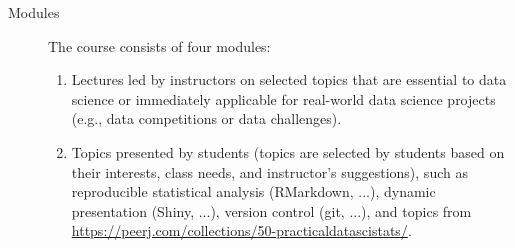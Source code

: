 \documentclass[twocolumn, 11pt]{article}
\begin{document}
\begin{description}
\item[Modules] 
The course consists of four modules:
\begin{enumerate}
\item
  Lectures led by instructors on selected topics that are essential to data
  science or immediately applicable for real-world data science projects (e.g.,
  data competitions or data challenges).
\item
  Topics presented by students (topics are selected by students based on
  their interests, class needs, and instructor's suggestions), such as
  reproducible  statistical analysis (RMarkdown, ...),
  dynamic presentation (Shiny, ...),
  version control (git, ...), and topics from
  \url{https://peerj.com/collections/50-practicaldatascistats/}.
  

\end{enumerate}
\end{description}
\end{document}

